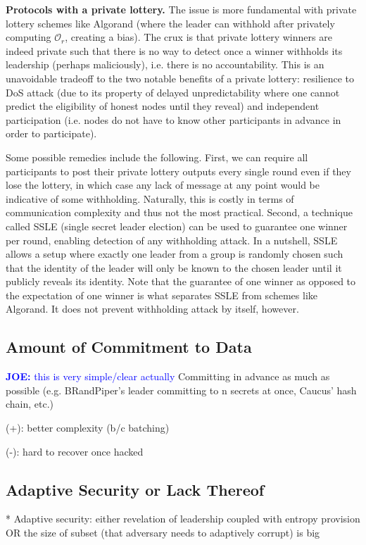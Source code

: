 \documentclass[letterpaper,twocolumn,10pt]{article}
\theoremstyle{definition}
\theoremstyle{remark}
\newcommand{\joenote}[1]{\textcolor{blue}{\textbf{JOE:} #1}}
\begin{document}
\noindent\textbf{Protocols with a private lottery.} The issue is more fundamental with private lottery schemes like Algorand (where the leader can withhold after privately computing $\mathcal{O}_r$, creating a bias). The crux is that private lottery winners are indeed private such that there is no way to detect once a winner withholds its leadership (perhaps maliciously), i.e. there is no accountability. This is an unavoidable tradeoff to the two notable benefits of a private lottery: resilience to DoS attack (due to its property of delayed unpredictability \cite{azouvi2018winning} where one cannot predict the eligibility of honest nodes until they reveal) and independent participation (i.e. nodes do not have to know other participants in advance in order to participate).

Some possible remedies include the following. First, we can require all participants to post their private lottery outputs every single round even if they lose the lottery, in which case any lack of message at any point would be indicative of some withholding. Naturally, this is costly in terms of communication complexity and thus not the most practical. Second, a technique called SSLE (single secret leader election) \cite{boneh2020single} can be used to guarantee one winner per round, enabling detection of any withholding attack. In a nutshell, SSLE allows a setup where exactly one leader from a group is randomly chosen such that the identity of the leader will only be known to the chosen leader until it publicly reveals its identity. Note that the guarantee of one winner as opposed to the expectation of one winner is what separates SSLE from schemes like Algorand. It does not prevent withholding attack by itself, however.

\subsection{Amount of Commitment to Data}
\joenote{this is very simple/clear actually}
Committing in advance as much as possible (e.g. BRandPiper's leader committing to n secrets at once, Caucus' hash chain, etc.)

(+): better complexity (b/c batching)

(-): hard to recover once hacked

\subsection{Adaptive Security or Lack Thereof}
* Adaptive security: either revelation of leadership coupled with entropy provision OR the size of subset (that adversary needs to adaptively corrupt) is big
\end{document}
